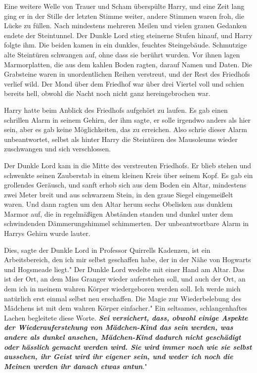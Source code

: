 Eine weitere Welle von Trauer und Scham überspülte Harry, und eine Zeit lang
ging er in der Stille der letzten Stimme weiter, andere Stimmen waren froh, die
Lücke zu füllen. Nach mindestens mehreren Meilen und vielen grauen Gedanken
endete der Steintunnel. Der Dunkle Lord stieg steinerne Stufen hinauf, und Harry
folgte ihm. Die beiden kamen in ein dunkles, feuchtes Steingebäude. Schmutzige
alte Steintüren schwangen auf, ohne dass sie berührt wurden. Vor ihnen lagen
Marmorplatten, die aus dem kahlen Boden ragten, darauf Namen und Daten. Die
Grabsteine waren in unordentlichen Reihen verstreut, und der Rest des Friedhofs
verlief wild. Der Mond über dem Friedhof war über drei Viertel voll und schien
bereits hell, obwohl die Nacht noch nicht ganz hereingebrochen war.

Harry hatte beim Anblick des Friedhofs aufgehört zu laufen. Es gab einen
schrillen Alarm in seinem Gehirn, der ihm sagte, er solle irgendwo anders als
hier sein, aber es gab keine Möglichkeiten, das zu erreichen. Also schrie dieser
Alarm unbeantwortet, selbst als hinter Harry die Steintüren des Mausoleums
wieder zuschwangen und sich verschlossen.

Der Dunkle Lord kam in die Mitte des verstreuten Friedhofs. Er blieb stehen und
schwenkte seinen Zauberstab in einem kleinen Kreis über seinem Kopf. Es gab ein
grollendes Geräusch, und sanft erhob sich aus dem Boden ein Altar, mindestens
zwei Meter breit und aus schwarzem Stein, in den graue Siegel eingemeißelt
waren. Und dann ragten um den Altar herum sechs Obelisken aus dunklem Marmor
auf, die in regelmäßigen Abständen standen und dunkel unter dem schwindenden
Dämmerungshimmel schimmerten. Der unbeantwortbare Alarm in Harrys Gehirn wurde
lauter.

\glqq{}Dies\grqq{}, sagte der Dunkle Lord in Professor Quirrells Kadenzen, \glqq
ist ein Arbeitsbereich, den ich mir selbst geschaffen habe, der in der Nähe von
Hogwarts und Hogsmeade liegt." Der Dunkle Lord wedelte mit einer Hand am Altar.
\glqq{}Das ist der Ort, an dem Miss Granger wieder auferstehen soll, und auch der
Ort, an dem ich in meinem wahren Körper wiedergeboren werden soll. Ich werde
mich natürlich erst einmal selbst neu erschaffen. Die Magie zur Wiederbelebung
des Mädchens ist mit dem wahren Körper einfacher." Ein seltsames,
schlangenhaftes Lachen begleitete diese Worte. \glqq{}\textbf{\emph{Sei
versichert, dass, obwohl einige Aspekte der Wiederauferstehung von Mädchen-Kind
das sein werden, was andere als dunkel ansehen, Mädchen-Kind dadurch nicht
geschädigt oder hässlich gemacht werden wird. Sie wird immer noch wie sie selbst
aussehen, ihr Geist wird ihr eigener sein, und weder ich noch die Meinen werden
ihr danach etwas antun}}."


